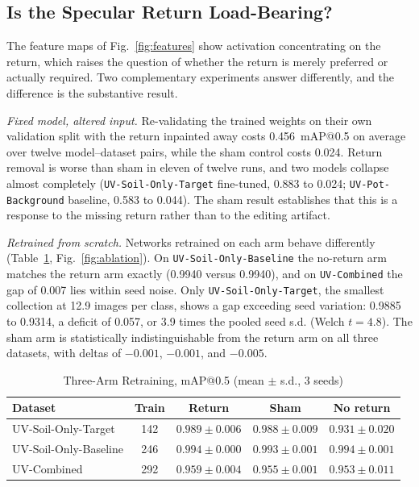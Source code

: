 ﻿\documentclass[journal]{IEEEtran}
\begin{document}
\subsection{Is the Specular Return Load-Bearing?}
\label{sec:ablation-results}
The feature maps of Fig.~\ref{fig:features} show activation concentrating on the return, which raises the question of whether the return is merely preferred or actually required. Two complementary experiments answer differently, and the difference is the substantive result.

\emph{Fixed model, altered input.} Re-validating the trained weights on their own validation split with the return inpainted away costs 0.456~mAP@0.5 on average over twelve model--dataset pairs, while the sham control costs 0.024. Return removal is worse than sham in eleven of twelve runs, and two models collapse almost completely (\texttt{UV-Soil-Only-Target} fine-tuned, 0.883 to 0.024; \texttt{UV-Pot-Background} baseline, 0.583 to 0.044). The sham result establishes that this is a response to the missing return rather than to the editing artifact.

\emph{Retrained from scratch.} Networks retrained on each arm behave differently (Table~\ref{tab:ablation}, Fig.~\ref{fig:ablation}). On \texttt{UV-Soil-Only-Baseline} the no-return arm matches the return arm exactly (0.9940 versus 0.9940), and on \texttt{UV-Combined} the gap of 0.007 lies within seed noise. Only \texttt{UV-Soil-Only-Target}, the smallest collection at 12.9 images per class, shows a gap exceeding seed variation: 0.9885 to 0.9314, a deficit of 0.057, or 3.9 times the pooled seed s.d. (Welch $t = 4.8$). The sham arm is statistically indistinguishable from the return arm on all three datasets, with deltas of $-0.001$, $-0.001$, and $-0.005$.

\begin{table}[!t]
\renewcommand{\arraystretch}{1.3}
\caption{Three-Arm Retraining, mAP@0.5 (mean $\pm$ s.d., 3 seeds)}
\label{tab:ablation}
\centering
\scriptsize
\setlength{\tabcolsep}{3pt}
\begin{tabular}{l c c c c}
\toprule
\textbf{Dataset} & \textbf{Train} & \textbf{Return} & \textbf{Sham} & \textbf{No return} \\
\midrule
UV-Soil-Only-Target & 142 & $0.989 \pm 0.006$ & $0.988 \pm 0.009$ & $0.931 \pm 0.020$ \\
UV-Soil-Only-Baseline & 246 & $0.994 \pm 0.000$ & $0.993 \pm 0.001$ & $0.994 \pm 0.001$ \\
UV-Combined & 292 & $0.959 \pm 0.004$ & $0.955 \pm 0.001$ & $0.953 \pm 0.011$ \\
\bottomrule
\end{tabular}
\end{table}
\end{document}
